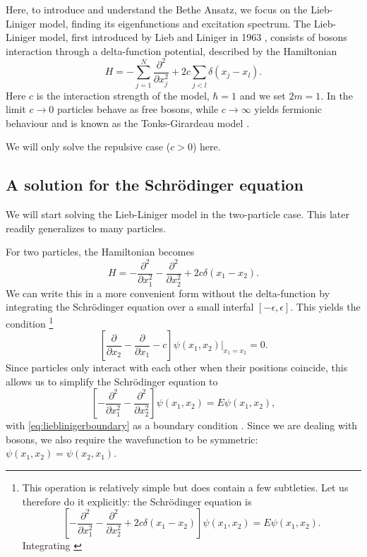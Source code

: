 \documentclass[11pt, a4paper]{report} %
\begin{document}
Here, to introduce and understand the Bethe Ansatz, we focus on the Lieb-Liniger model, finding its eigenfunctions and excitation spectrum.
The Lieb-Liniger model, first introduced by Lieb and Liniger in 1963 \cite{Lieb1963, Lieb1963a}, consists of bosons interaction through a delta-function potential, described by the Hamiltonian
\begin{equation}
	H = - \sum_{j=1}^{N} \frac{\partial^2}{\partial x_j^2} + 2c \sum_{j<l} \delta(x_j - x_l).
\end{equation}
Here \(c\) is the interaction strength of the model, \(\hbar=1\) and we set \(2m=1\).
In the limit \(c\to0\) particles behave as free bosons, while \(c\to\infty\) yields fermionic behaviour and is known as the Tonks-Girardeau model \cite{Lieb1963, Franchini2017}.

We will only solve the repulsive case (\(c > 0\)) here. 

\subsection{A solution for the Schrödinger equation}

We will start solving the Lieb-Liniger model in the two-particle case. This later readily generalizes to many particles.

For two particles, the Hamiltonian becomes
\begin{equation}
	H =  - \frac{\partial^2}{\partial x_1^2} - \frac{\partial^2}{\partial x_2^2} + 2c \delta(x_1 - x_2).
\end{equation}
We can write this in a more convenient form without the delta-function by integrating the Schrödinger equation over a small interfal \([-\epsilon,\epsilon]\).
This yields the condition \cite{Lieb1963}\footnote{This operation is relatively simple but does contain a few subtleties. Let us therefore do it explicitly:
the Schrödinger equation is
\begin{equation}
	\left[- \frac{\partial^2}{\partial x_1^2} - \frac{\partial^2}{\partial x_2^2} + 2c \delta(x_1 - x_2)\right] \psi(x_1, x_2) = E \psi(x_1,x_2).
\end{equation} 
Integrating \cite{Griffiths1993}
}
\begin{equation}\label{eq:lieblinigerboundary}
	\left[\frac{\partial}{\partial x_2} - \frac{\partial}{\partial x_1} - c\right] \psi(x_1, x_2)\bigg\rvert_{x_1 = x_2} = 0.
\end{equation}
Since particles only interact with each other when their positions coincide, this allows us to simplify the Schrödinger equation to
\begin{equation}\label{eq:lieblinigersimple}
	\left[- \frac{\partial^2}{\partial x_1^2} - \frac{\partial^2}{\partial x_2^2}\right] \psi(x_1, x_2) = E \psi(x_1,x_2),
\end{equation}
with \cref{eq:lieblinigerboundary} as a boundary condition \cite{Lieb1963}.
Since we are dealing with bosons, we also require the wavefunction to be symmetric: \(\psi(x_1,x_2) = \psi(x_2,x_1)\).
\end{document}
